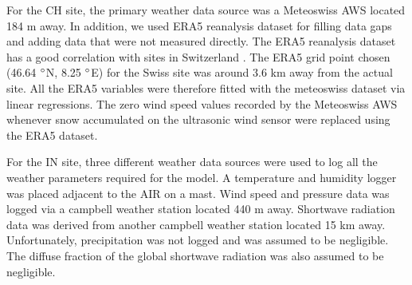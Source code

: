 \documentclass[utf8]{frontiersSCNS} %
\begin{document}
For the CH site, the primary weather data source was a Meteoswiss AWS located 184 m away. In addition, we used ERA5
reanalysis dataset \citep{era5} for filling data gaps and adding data that were not measured directly.  The ERA5
reanalysis dataset has a good correlation with sites in Switzerland \citep{Scherrer_2020}. The ERA5 grid point
chosen (46.64 $\degree$N, 8.25 $\degree$E) for the Swiss site was around 3.6 km away from the actual site.  All the
ERA5 variables were therefore fitted with the meteoswiss dataset via linear regressions. The zero wind speed values
recorded by the Meteoswiss AWS whenever snow accumulated on the ultrasonic wind sensor were replaced using the ERA5
dataset.

For the IN site, three different weather data sources were used to log all the weather parameters required for the
model. A temperature and humidity logger was placed adjacent to the AIR on a mast. Wind speed and pressure data was
logged via a campbell weather station located 440 m away. Shortwave radiation data was derived from another campbell
weather station located 15 km away. Unfortunately, precipitation was not logged and was assumed to be negligible. The
diffuse fraction of the global shortwave radiation was also assumed to be negligible.
\end{document}
